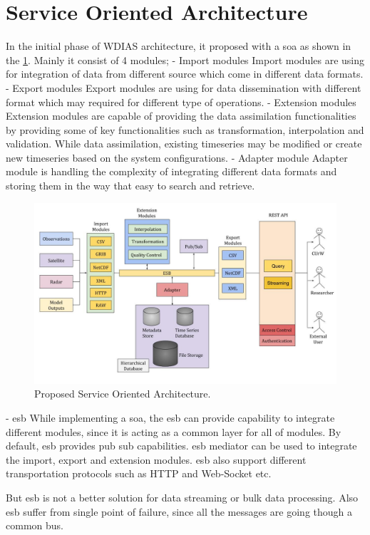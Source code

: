 \section{Service Oriented Architecture}

In the initial phase of WDIAS architecture, it proposed with a \acrfull{soa} as shown in the \ref{fi:proposed_soa}. Mainly it consist of 4 modules;
- Import modules
Import modules are using for integration of data from different source which come in different data formats.
- Export modules
Export modules are using for data dissemination with different format which may required for different type of operations.
- Extension modules
Extension modules are capable of providing the data assimilation functionalities by providing some of key functionalities such as transformation, interpolation and validation. While data assimilation, existing timeseries may be modified or create new timeseries based on the system configurations.
- Adapter module
Adapter module is handling the complexity of integrating different data formats and storing them in the way that easy to search and retrieve.

\begin{figure}[htp]
    \centering
    \includegraphics[width=1\textwidth]{soa/soa_v1.jpg}
    \caption{Proposed Service Oriented Architecture.}
    \label{fi:proposed_soa}
\end{figure}

- \acrfull{esb}
While implementing a \acrfull{soa}, the \acrfull{esb} can provide capability to integrate different modules, since it is acting as a common layer for all of modules.
By default, \acrshort{esb} provides pub sub capabilities.
\acrshort{esb} mediator can be used to integrate the import, export and extension modules. \acrshort{esb} also support different transportation protocols such as HTTP and Web-Socket etc.

But \acrshort{esb} is not a better solution for data streaming or bulk data processing. Also \acrshort{esb} suffer from single point of failure, since all the messages are going though a common bus.